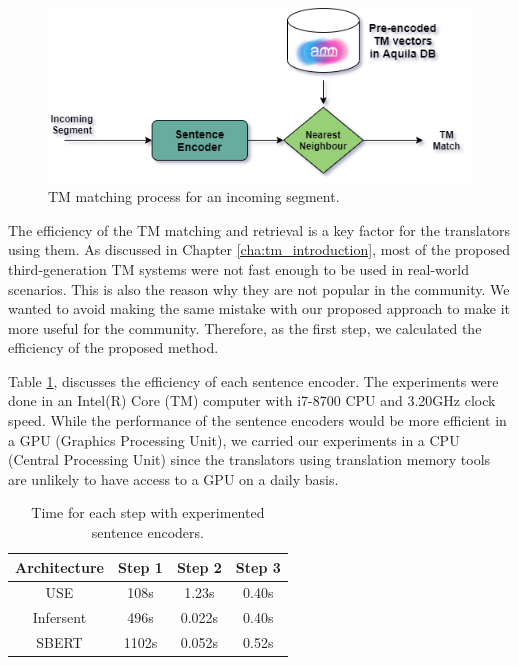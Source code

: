 	
	
	
	\begin{figure}[ht]
		\centering
		\includegraphics[scale=0.6]{figures/translation_memories/sentence_encoders/TM.png}
		\caption[TM Matching Process for an Incoming Segment]{TM matching process for an incoming segment.}
		\label{fig:TM}
	\end{figure}
	

The efficiency of the TM matching and retrieval is a key factor for the translators using them. As discussed in Chapter \ref{cha:tm_introduction}, most of the proposed third-generation TM systems were not fast enough to be used in real-world scenarios. This is also the reason why they are not popular in the community. We wanted to avoid making the same mistake with our proposed approach to make it more useful for the community. Therefore, as the first step, we calculated the efficiency of the proposed method. 

Table \ref{tab:tm_efficiency}, discusses the efficiency of each sentence encoder. The experiments were done in an Intel(R) Core (TM) computer with i7-8700  CPU and 3.20GHz clock speed. While the performance of the sentence encoders would be more efficient in a GPU (Graphics Processing Unit), we carried our experiments in a CPU (Central Processing Unit) since the translators using translation memory tools are unlikely to have access to a GPU on a daily basis. 


\begin{table}[t]
	\centering
		\begin{tabular}{|c|c|c|c|}
			\hline
			\textbf{Architecture} & \textbf{Step 1} & \textbf{Step 2} & \textbf{Step 3}\\ 
			\hline
			USE & 108s & 1.23s & 0.40s \\
			Infersent & 496s & 0.022s & 0.40s \\
			SBERT & 1102s & 0.052s & 0.52s \\
			\hline
		\end{tabular}
		\caption[Time for each step with experimented sentence encoders.]{Time for each step with experimented sentence encoders.}
		\label{tab:tm_efficiency}
\end{table}

